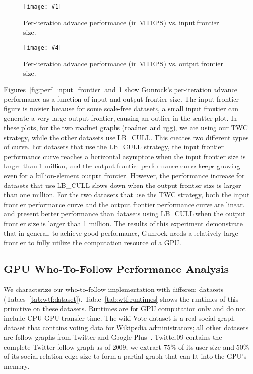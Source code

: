 \documentclass[format=acmsmall,review=false,screen=true]{acmart}
\newcommand\TwoFig[6]{%
  \sbox\IBoxA{\texttt{[image: \#1]}}
  \sbox\IBoxB{\texttt{[image: \#4]}}%
  \ifdim\ht\IBoxA>\ht\IBoxB
    \setlength\IHeight{\ht\IBoxB}\else\setlength\IHeight{\ht\IBoxA}\fi%
  \begin{figure}[!htb]
  \minipage[t]{0.49\textwidth}\centering
  \texttt{[image: \#1]}
  \caption{#2}\label{#3}
  \endminipage\hfill
  \minipage[t]{0.49\textwidth}\centering
  \texttt{[image: \#4]}
  \caption{#5}\label{#6}
  \endminipage
  \end{figure}%
}
\begin{document}
\TwoFig{perf_input_frontier.pdf}
{Per-iteration advance performance (in MTEPS) vs. input frontier size.}
{fig:perf_input_frontier}
{perf_output_frontier.pdf}
{Per-iteration advance performance (in MTEPS) vs. output frontier size.}
{fig:perf_output_frontier}

Figures~\ref{fig:perf_input_frontier}
and~\ref{fig:perf_output_frontier} show Gunrock's per-iteration
advance performance as a function of input and output frontier size.
The input frontier figure is noisier because for some scale-free
datasets, a small input frontier can generate a very large output
frontier, causing an outlier in the scatter plot. In these plots, for
the two roadnet graphs (roadnet and rgg), we are using our TWC
strategy, while the other datasets use LB\_CULL\@. This creates two
different types of curve. For datasets that use the LB\_CULL strategy,
the input frontier performance curve reaches a horizontal asymptote
when the input frontier size is larger than 1 million, and the output
frontier performance curve keeps growing even for a billion-element
output frontier. However, the performance increase for datasets that
use LB\_CULL slows down when the output frontier size is larger than
one million. For the two datasets that use the TWC strategy, both the
input frontier performance curve and the output frontier performance
curve are linear, and present better performance than datasets using
LB\_CULL when the output frontier size is larger than 1 million. The
results of this
experiment demonstrate that in general, to achieve good performance,
Gunrock needs a relatively large frontier to fully utilize the
computation resource of a GPU\@.

\subsection{GPU Who-To-Follow Performance Analysis}
We characterize our who-to-follow implementation with different
datasets (Tables~\ref{tab:wtf:dataset}). Table~\ref{tab:wtf:runtimes}
shows the runtimes of this primitive on these datasets. Runtimes are
for GPU computation only and do not include CPU-GPU transfer time. The
wiki-Vote dataset is a real social graph dataset that contains voting
data for Wikipedia administrators; all other datasets are follow
graphs from Twitter and Google
Plus~\cite{Leslovec:2014:SLN,Kwak:2010:WIT}. Twitter09 contains the
complete Twitter follow graph as of 2009; we extract 75\% of its user
size and 50\% of its social relation edge size to form a partial graph
that can fit into the GPU's memory.
\end{document}
